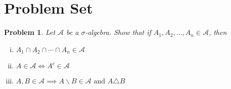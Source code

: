 \documentclass{article}
\newtheorem{problem}{Problem}
\begin{document}
\section*{Problem Set}

\begin{problem}
Let $\mathscr{A}$ be a $\sigma$-algebra. Show that if $A_1, A_2, \dots, A_n \in \mathscr{A}$, then 
\begin{enumerate}[i)]
	\item $A_1 \cap A_2 \cap \cdots \cap A_n \in \mathscr{A}$
	\item $A \in \mathscr{A} \iff A^c \in \mathscr{A}$
	\item $A,B \in \mathscr{A} \implies A\backslash B \in \mathscr{A} \text{ and } A \triangle B$

    \end{enumerate}
\end{problem}

\vspace{1em} %


\vspace{1em}
\end{document}
